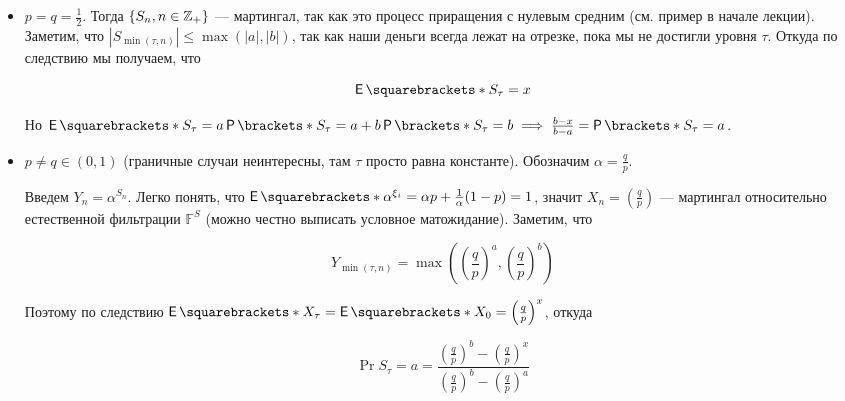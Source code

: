\begin{itemize}
  \item $p = q = \frac12$. Тогда $\{S_n, n \in \mathbb{Z}_+\}$ --- мартингал, так как
  это процесс приращения с нулевым средним (см. пример в начале лекции).
  Заметим, что $|S_{\min(\tau, n)}| \leq \max(|a|, |b|)$, так как наши деньги
  всегда лежат на отрезке, пока мы не достигли уровня $\tau$. Откуда по следствию
  мы получаем, что

  \[
    \E{S_\tau} = x
  \]

  Но $\E{S_\tau} = a\Pr{S_\tau = a} + b\Pr{S_\tau = b} \implies \frac{b - x}{b 
  - a} = \Pr{S_\tau = a}$.

  \item $p \neq q \in (0, 1)$ (граничные случаи неинтересны, там $\tau$ просто
  равна константе). Обозначим $\alpha = \frac{q}{p}$.

  Введем $Y_n = \alpha^{S_n}$. Легко понять, что $\E{\alpha^{\xi_i}} =
  \alpha p + \frac{1}{\alpha}(1 - p) = 1$, значит $X_n = \left(\frac{q}{p}\right)$
  --- мартингал относительно естественной фильтрации $\mathbb{F}^S$ (можно честно
  выписать условное матожидание). Заметим, что

  \[
    Y_{\min(\tau, n)} = \max\left(\left(\frac{q}{p}\right)^a, \left(\frac{q}{p}\right)^b\right)
  \]

  Поэтому по следствию $\E{X_{\tau}} = \E{X_0} = \left(\frac{q}{p}\right)^x$, откуда

  \[
    \Pr{S_{\tau} = a} = \frac{\left(\frac{q}{p}\right)^b - 
    \left(\frac{q}{p}\right)^x}{\left(\frac{q}{p}\right)^b - \left(\frac{q}{p}\right)^a}
  \]
\end{itemize}
